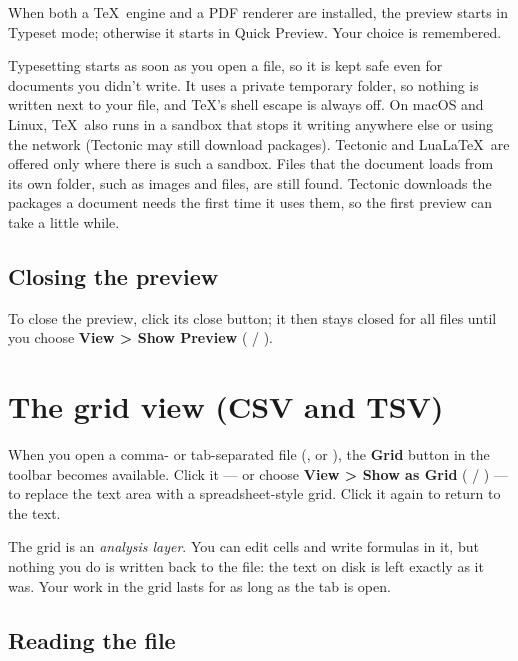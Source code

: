 \documentclass[11pt,a4paper]{article}
\newcommand{\menu}[1]{\textsf{\textbf{#1}}}
\begin{document}
When both a \TeX\ engine and a PDF renderer are installed, the preview starts
in Typeset mode; otherwise it starts in Quick Preview. Your choice is
remembered.

\begin{note}
Typesetting starts as soon as you open a file, so it is kept safe even for
documents you didn't write. It uses a private temporary folder, so nothing is
written next to your file, and \TeX's shell escape is always off. On macOS and
Linux, \TeX\ also runs in a sandbox that stops it writing anywhere else or
using the network (Tectonic may still download packages). Tectonic and
Lua\LaTeX\ are offered only where there is such a sandbox. Files that the
document loads from its own folder, such as images and \verb|| files,
are still found. Tectonic downloads the packages a document needs the first
time it uses them, so the first preview can take a little while.
\end{note}

\subsection{Closing the preview}

To close the preview, click its close button; it then stays closed for all
files until you choose \menu{View > Show Preview}
( / ).

\section{The grid view (CSV and TSV)}\label{sec:grid}

When you open a comma- or tab-separated file (,  or
), the \textbf{Grid} button in the toolbar becomes available. Click
it --- or choose \menu{View > Show as Grid} ( / ) --- to
replace the text area with a spreadsheet-style grid. Click it again to return
to the text.

The grid is an \emph{analysis layer}. You can edit cells and write formulas in
it, but nothing you do is written back to the file: the text on disk is left
exactly as it was. Your work in the grid lasts for as long as the tab is open.

\subsection{Reading the file}
\end{document}
